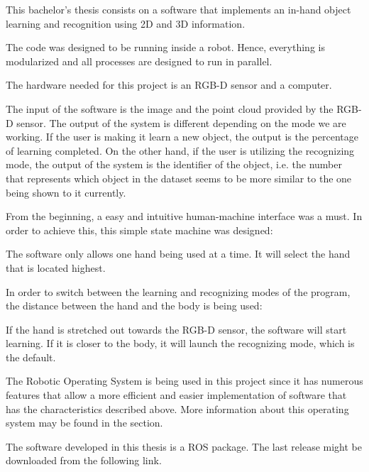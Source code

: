 
This bachelor's thesis consists on a software that implements an in-hand object learning and recognition using 2D and 3D 
information. 

The code was designed to be running inside a robot. Hence, everything is modularized and all processes are designed to 
run in parallel. 

The hardware needed for this project is an RGB-D sensor and a computer. 

The input of the software is the image and the point cloud provided by the RGB-D sensor. The output of the system is 
different depending on the mode we are working. If the user is making it learn a new object, the output is the 
percentage of learning completed. On the other hand, if the user is utilizing the recognizing mode, the output of the
system is the identifier of the object, i.e. the number that represents which object in the dataset seems to be more 
similar to the one being shown to it currently. 


From the beginning, a easy and intuitive human-machine interface was a must. In order to achieve this, this simple state 
machine was designed:


The software only allows one hand being used at a time. It will select the hand that is located highest. 

In order to switch between the learning and recognizing modes of the program, the distance between the hand and the body
is being used: 

If the hand is stretched out towards the RGB-D sensor, the software will start learning. If it is closer to the body, 
it will launch the recognizing mode, which is the default. 



The Robotic Operating System is being used in this project since it has numerous features that allow a more efficient and 
easier implementation of software that has the characteristics described above. More information about this operating 
system may be found in the section.

The software developed in this thesis is a ROS package. The last release might be downloaded from the following link. 

